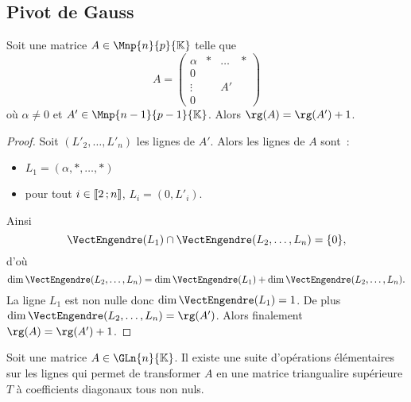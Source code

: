 \subsection{Pivot de Gauss}
%
\begin{lemme}
  Soit une matrice $A \in \Mnp{n}{p}{\K}$ telle que
  \begin{equation}
    A =
    \begin{pmatrix}
      \alpha & * & \ldots & * \\
      0 & & & \\
      \vdots & & A' & \\
      0 & & & 
    \end{pmatrix}
  \end{equation}
  où $\alpha \neq 0$ et $A'\in \Mnp{n-1}{p-1}{\K}$. Alors $\rg(A)=\rg(A')+1$.
\end{lemme}
\begin{proof}
  Soit $(L'_2, \ldots, L'_n)$ les lignes de $A'$. Alors les lignes de $A$ sont~:
  \begin{itemize}
  \item $L_1=(\alpha, *, \ldots, *)$
  \item pour tout $i \in \mathopen{\llbracket}2\mathclose{}\mathpunct{};n\mathclose{\rrbracket}$, $L_i=(0,L'_i)$.
  \end{itemize}
  Ainsi
  \begin{equation}
    \VectEngendre(L_1) \cap \VectEngendre(L_2, \ldots, L_n)=\{0\},
  \end{equation}
  d'où
  \begin{equation}
    \dim \VectEngendre(L_2, \ldots, L_n) = \dim \VectEngendre(L_1) + \dim \VectEngendre(L_2, \ldots, L_n).
  \end{equation}
  La ligne $L_1$ est non nulle donc $\dim \VectEngendre(L_1)=1$. De plus $\dim \VectEngendre(L_2, \ldots, L_n) = \rg(A')$. Alors finalement $\rg(A)=\rg(A')+1$.
\end{proof}
%
\begin{prop}
  Soit une matrice $A \in \GLn{n}{\K}$. Il existe une suite d'opérations élémentaires sur les lignes qui permet de transformer $A$ en une matrice triangualire supérieure $T$ à coefficients diagonaux tous non nuls.
\end{prop}
